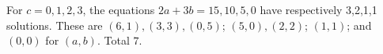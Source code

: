 For $c=0,1,2,3$, the equations $2a+3b=15,10,5,0$ have respectively 3,2,1,1 solutions. These are $(6,1),(3,3),(0,5)$; $(5,0),(2,2)$; $(1,1)$; and $(0,0)$ for $(a,b)$. Total $\boxed7$.
